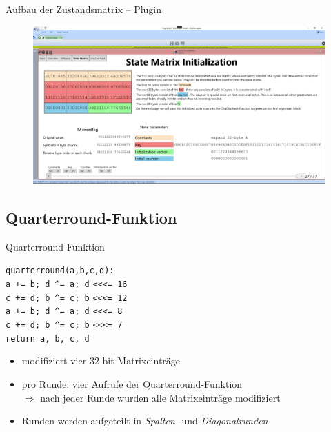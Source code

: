 \documentclass{beamer}
\begin{document}
\begin{frame}{Aufbau der Zustandsmatrix -- Plugin}
\begin{figure}
\center
\begin{minipage}{\textwidth}
\includegraphics[width=\textwidth]{figures/state-matrix/4-state-matrix-iv.png}
\end{minipage}
\end{figure}
\end{frame}

\subsection{Quarterround-Funktion}
\begin{frame}[fragile]{Quarterround-Funktion}
\begin{center}
\begin{minipage}{0.5\linewidth}
\texttt{quarterround(a,b,c,d):} \\
\hspace*{2em}\texttt{a += b; d  \^{}= a; d} \verb|<<<|\texttt{= 16} \\
\hspace*{2em}\texttt{c += d; b \^{}= c; b} \verb|<<<|\texttt{= 12} \\
\hspace*{2em}\texttt{a += b; d \^{}= a; d} \verb|<<<|\texttt{= 8} \\
\hspace*{2em}\texttt{c += d; b \^{}= c; b} \verb|<<<|\texttt{= 7} \\
\hspace*{2em}\texttt{return a, b, c, d}
\end{minipage}
\end{center}
\begin{itemize}
\item modifiziert vier 32-bit Matrixeinträge
\item pro Runde: vier Aufrufe der Quarterround-Funktion \\
$\Rightarrow$ nach jeder Runde wurden alle Matrixeinträge modifiziert
\item Runden werden aufgeteilt in \textit{Spalten-} und \textit{Diagonalrunden}
\end{itemize}
\end{frame}
\end{document}
